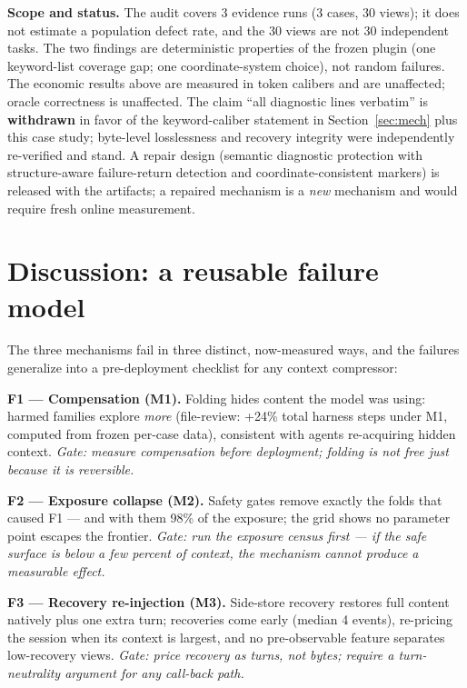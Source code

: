 \documentclass[twocolumn]{svjour3}       %
\begin{document}
\textbf{Scope and status.} The audit covers 3 evidence runs (3 cases, 30 views); it does
not estimate a population defect rate, and the 30 views are not 30 independent tasks.
The two findings are deterministic properties of the frozen plugin (one keyword-list
coverage gap; one coordinate-system choice), not random failures. The economic results
above are measured in token calibers and are unaffected; oracle correctness is
unaffected. The claim ``all diagnostic lines verbatim'' is \textbf{withdrawn} in favor
of the keyword-caliber statement in Section~\ref{sec:mech} plus this case study;
byte-level losslessness and recovery integrity were independently re-verified and stand.
A repair design (semantic diagnostic protection with structure-aware failure-return
detection and coordinate-consistent markers) is released with the artifacts; a repaired
mechanism is a \emph{new} mechanism and would require fresh online measurement.

\section{Discussion: a reusable failure model}
\label{sec:disc}

The three mechanisms fail in three distinct, now-measured ways, and the failures
generalize into a pre-deployment checklist for any context compressor:

\textbf{F1 --- Compensation (M1).} Folding hides content the model was using: harmed
families explore \emph{more} (file-review: +24\% total harness steps under M1, computed
from frozen per-case data), consistent with
agents re-acquiring hidden context. \emph{Gate: measure compensation before deployment;
folding is not free just because it is reversible.}

\textbf{F2 --- Exposure collapse (M2).} Safety gates remove exactly the folds that caused
F1 --- and with them 98\% of the exposure; the grid shows no parameter point escapes the
frontier. \emph{Gate: run the exposure census first --- if the safe surface is below a
few percent of context, the mechanism cannot produce a measurable effect.}

\textbf{F3 --- Recovery re-injection (M3).} Side-store recovery restores full content
natively plus one extra turn; recoveries come early (median 4 events), re-pricing the
session when its context is largest, and no pre-observable feature separates
low-recovery views. \emph{Gate: price recovery as turns, not bytes; require a
turn-neutrality argument for any call-back path.}
\end{document}
